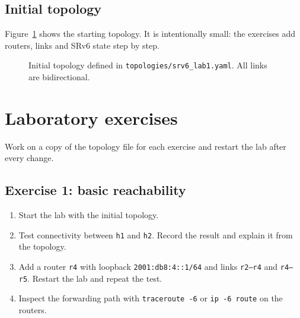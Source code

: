 \documentclass[11pt,letterpaper]{report}
\newcommand{\code}[1]{\texttt{#1}}
\begin{document}
\section{Initial topology}

Figure~\ref{fig:initial} shows the starting topology.  It is intentionally
small: the exercises add routers, links and SRv6 state step by step.

\begin{figure}[htbp]
  \centering
  \caption{Initial topology defined in \code{topologies/srv6\_lab1.yaml}.
  All links are bidirectional.}
  \label{fig:initial}
\end{figure}

\chapter{Laboratory exercises}

Work on a copy of the topology file for each exercise and restart the lab
after every change. 

\section{Exercise 1: basic reachability}

\begin{enumerate}
  \item Start the lab with the initial topology.
  \item Test connectivity between \code{h1} and \code{h2}.  Record the result
        and explain it from the topology.
  \item Add a router \code{r4} with loopback \code{2001:db8:4::1/64} and links
        \code{r2--r4} and \code{r4--r5}.  Restart the lab and repeat the test.
  \item Inspect the forwarding path with \code{traceroute -6} or
        \code{ip -6 route} on the routers.
\end{enumerate}
\end{document}
